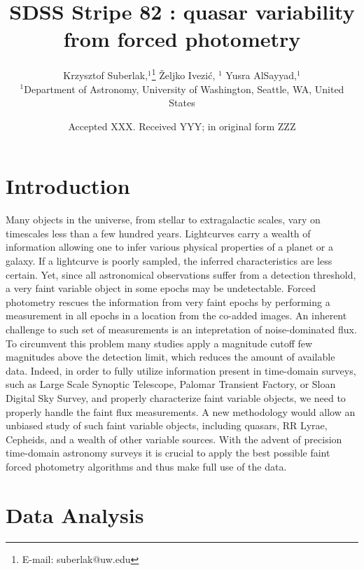 \documentclass[fleqn,usenatbib]{mnras}  %
\title[SDSS Quasars]{SDSS Stripe 82 : quasar variability from forced photometry}
\author[K. Suberlak et al.]{
Krzysztof Suberlak,$^{1}$\thanks{E-mail: suberlak@uw.edu}
\v{Z}eljko Ivezi\'c, $^{1}$
Yusra AlSayyad,$^{1}$ 
\\
$^{1}$Department of Astronomy, University of Washington, Seattle, WA, United States\\
}
\date{Accepted XXX. Received YYY; in original form ZZZ}
\begin{document}
\label{firstpage}
\pagerange{\pageref{firstpage}--\pageref{lastpage}}
\maketitle

\begin{abstract}

\end{abstract}




\section{Introduction}
\label{sec:intro}
Many objects in the universe, from stellar to extragalactic scales, vary on timescales less than a few hundred years. Lightcurves carry a wealth of information allowing one to infer various physical properties of a planet or a galaxy. If a lightcurve is poorly sampled, the inferred  characteristics are less certain. Yet, since all  astronomical observations suffer from a detection threshold, a very faint variable object in some epochs may be undetectable. Forced photometry rescues the information from very faint epochs by performing a measurement in all epochs in a location from the co-added images. An inherent challenge to such set of measurements is an intepretation of noise-dominated flux. To circumvent this problem many studies apply a magnitude cutoff few magnitudes above the detection limit, which reduces the amount of available data. Indeed, in order to fully utilize information present in time-domain surveys, such as Large Scale Synoptic Telescope, Palomar Transient Factory, or Sloan Digital Sky Survey, and properly characterize faint variable objects, we need to properly handle the faint flux measurements. A new methodology would allow an unbiased  study of such faint variable objects, including quasars,  RR Lyrae,  Cepheids, and a wealth of other variable sources.  With the advent of precision  time-domain astronomy  surveys it is crucial to apply the best possible faint forced photometry algorithms and thus make full use of the  data.  

\section{Data Analysis}
\label{sec:data}
\end{document}
